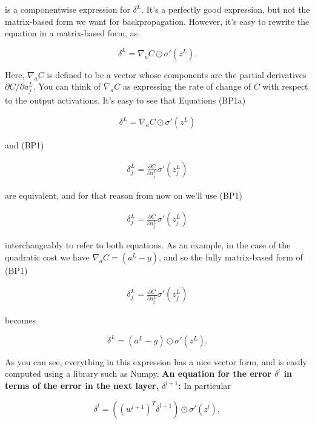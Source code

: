 \noindent is a componentwise expression for $\delta^L$. It's a perfectly good expression, but not the matrix-based form we want for backpropagation. However, it's easy to rewrite the equation in a matrix-based form, as

\begin{equation}
\delta^L = \nabla_a C \odot \sigma'(z^L).
\tag{BP1a}
\end{equation}

\noindent Here, $\nabla_a C$ is defined to be a vector whose components are the partial derivatives $\partial C / \partial a^L_j$. You can think of $\nabla_a C$ as expressing the rate of change of $C$ with respect to the output activations. It's easy to see that Equations (BP1a)

\begin{align*}
\delta^L = \nabla_a C \odot \sigma'(z^L) \nonumber
\end{align*}

\noindent and (BP1)

\begin{align*}
\delta^L_j = \frac{\partial C}{\partial a^L_j} \sigma'(z^L_j) \nonumber
\end{align*}

\noindent are equivalent, and for that reason from now on we'll use (BP1)

\begin{align*}
\delta^L_j = \frac{\partial C}{\partial a^L_j} \sigma'(z^L_j) \nonumber
\end{align*}

\noindent interchangeably to refer to both equations. As an example, in the case of the quadratic cost we have $\nabla_a C = (a^L-y)$, and so the fully matrix-based form of (BP1)

\begin{align*}
\delta^L_j = \frac{\partial C}{\partial a^L_j} \sigma'(z^L_j) \nonumber
\end{align*}

\noindent becomes

\begin{equation}
\delta^L = (a^L-y) \odot \sigma'(z^L).
\tag{30}
\end{equation}

\noindent As you can see, everything in this expression has a nice vector form, and is easily computed using a library such as Numpy. \textbf{An equation for the error $\delta^l$ in terms of the error in the next layer, $\delta^{l+1}$:} In particular

\begin{equation}
\delta^l = ((w^{l+1})^T \delta^{l+1}) \odot \sigma'(z^l),
\tag{BP2}
\end{equation}

